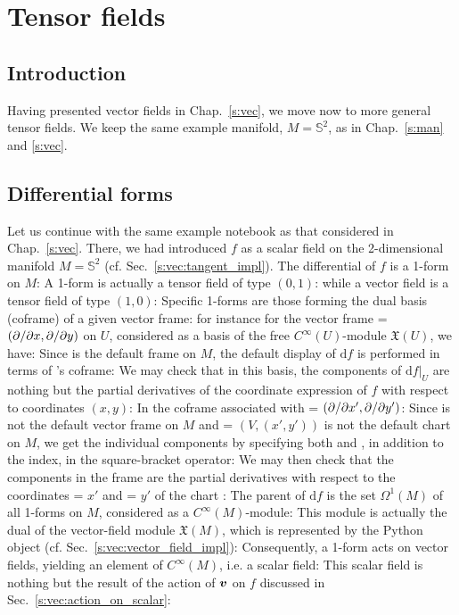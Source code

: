 \chapter{Tensor fields} \label{s:ten}

\minitoc

\section{Introduction}

Having presented vector fields in Chap.~\ref{s:vec}, we move now to more
general tensor fields. We keep the same example manifold, $M = \mathbb{S}^2$,
as in Chap.~\ref{s:man} and \ref{s:vec}.

\section{Differential forms}

Let us continue with the same example notebook as that considered in
Chap.~\ref{s:vec}. There, we had introduced $f$ as a scalar field on
the 2-dimensional manifold $M = \mathbb{S}^2$ (cf. Sec.~\ref{s:vec:tangent_impl}).
The differential of $f$ is a 1-form on $M$:
A 1-form is actually a tensor field of type $(0,1)$:
while a vector field is a tensor field of type $(1,0)$:
Specific 1-forms are those forming the dual basis (coframe) of a given vector
frame: for instance for the vector frame  = $({\partial }/{\partial x},{\partial }/{\partial y})$
on $U$, considered as a basis of the free $C^\infty(U)$-module $\mathfrak{X}(U)$,
we have:
Since  is the default frame on $M$, the default display of $\mathrm{d}f$
is performed in terms of 's coframe:
We may check that in this basis, the components of $\left. \mathrm{d}f \right| _U$
are nothing but the partial derivatives of the coordinate expression of $f$
with respect to coordinates $(x,y)$:
In the coframe associated with  = $({\partial }/{\partial x'},{\partial }/{\partial y'})$:
Since  is not the default vector frame on $M$ and  = $(V,(x',y'))$
is not the default chart on $M$, we get the individual components by
specifying both  and , in addition to the index, in the
square-bracket operator:
We may then check that the components in the frame 
are the partial derivatives with respect to the coordinates  = $x'$ and
 = $y'$ of the chart :
The parent of $\mathrm{d}f$ is the set $\Omega^1(M)$ of all 1-forms on $M$,
considered as a $C^\infty(M)$-module:
This module is actually the dual of the vector-field module $\mathfrak{X}(M)$,
which is represented
by the Python object  (cf. Sec.~\ref{s:vec:vector_field_impl}):
Consequently, a 1-form acts on vector fields, yielding an element of
$C^\infty(M)$, i.e. a scalar field:
This scalar field is nothing but the result of the action of $\bm{v}$ on $f$
discussed in Sec.~\ref{s:vec:action_on_scalar}:

